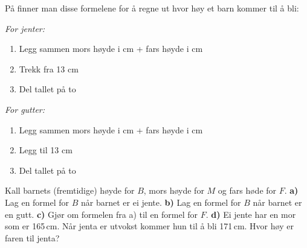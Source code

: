 På
 finner man disse formelene for å regne ut hvor høy et barn kommer til å bli:\os

\textit{For jenter:}
\begin{enumerate}
	\item Legg sammen mors høyde i cm + fars høyde i cm
	\item Trekk fra 13 cm
	\item Del tallet på to
\end{enumerate}

\textit{For gutter:}
\begin{enumerate}
	\item Legg sammen mors høyde i cm + fars høyde i cm
	\item Legg til 13 cm
	\item Del tallet på to
\end{enumerate}
Kall barnets (fremtidige) høyde for $ B $, mors høyde for $ M $ og fars høde for $ F $.\os
\textbf{a)} Lag en formel for $ B $ når barnet er ei jente.\os
\textbf{b)} Lag en formel for $ B $ når barnet er en gutt.\os
\textbf{c)} Gjør om formelen fra a) til en formel for $ F $.\os
\textbf{d)} Ei jente har en mor som er 165\,cm. Når jenta er utvokst kommer hun til å bli 171\,cm. Hvor høy er faren til jenta?



